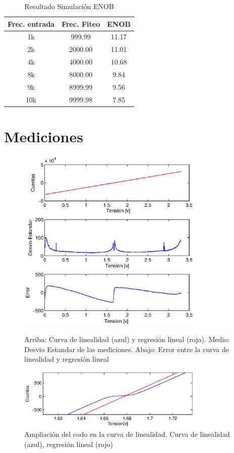 \documentclass[a4paper,conference]{IEEEtran}
\begin{document}
\begin{table}[!h]
	\renewcommand{\arraystretch}{1.3}
	\caption{Resultado Simulaci\'on ENOB}
	\label{Tabla:sim}
	\centering
	\begin{tabular}{|c|c|c|}
		\hline
		Frec. entrada & Frec. Fiteo & ENOB\\
		\hline
		1k & 999.99 & 11.17\\
		\hline
		2k & 2000.00 & 11.01\\
		\hline
		4k & 4000.00 & 10.68\\
		\hline
		8k & 8000.00 & 9.84\\
		\hline
		9k & 8999.99 & 9.56\\
		\hline
		10k & 9999.98 & 7.85\\
		\hline
	\end{tabular}
\end{table}

\section{Mediciones}

\begin{figure}[!b]
\centering
\includegraphics[width=3.5in]{Linealidad}
\caption{Arriba: Curva de linealidad (azul) y regresión lineal (roja). Medio: Desvio Estandar de las mediciones. Abajo: Error entre la curva de linealidad y regresión lineal}

\label{fig:lin}
	\centering
	\includegraphics[width=3.5in]{Linealidad_codo}
	\caption{Ampliación del codo en la curva de linealidad. Curva de linealidad (azul), regresión lineal (rojo)}
	
	\label{fig:lincodo}
\end{figure}
\end{document}
